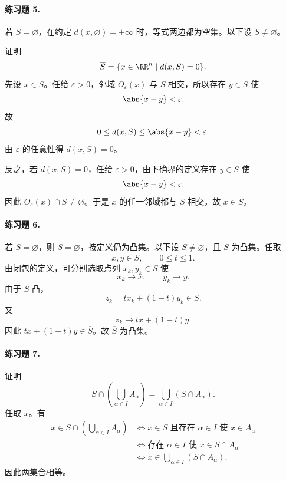 \paragraph{练习题 5.}
\begin{xsolution}
若 $S=\varnothing$，在约定 $d(x,\varnothing)=+\infty$ 时，等式两边都为空集。以下设 $S\neq\varnothing$。

证明
\[
  \overline S=\{x\in\RR^n\mid d(x,S)=0\}.
\]
先设 $x\in\overline S$。任给 $\varepsilon>0$，邻域 $O_\varepsilon(x)$ 与 $S$ 相交，所以存在 $y\in S$ 使
\[
  \abs{x-y}<\varepsilon.
\]
故
\[
  0\leq d(x,S)\leq\abs{x-y}<\varepsilon.
\]
由 $\varepsilon$ 的任意性得 $d(x,S)=0$。

反之，若 $d(x,S)=0$，任给 $\varepsilon>0$，由下确界的定义存在 $y\in S$ 使
\[
  \abs{x-y}<\varepsilon.
\]
因此 $O_\varepsilon(x)\cap S\neq\varnothing$。于是 $x$ 的任一邻域都与 $S$ 相交，故 $x\in\overline S$。
\end{xsolution}

\paragraph{练习题 6.}
\begin{xsolution}
若 $S=\varnothing$，则 $\overline S=\varnothing$，按定义仍为凸集。以下设 $S\neq\varnothing$，且 $S$ 为凸集。任取
\[
  x,y\in\overline S,\qquad 0\leq t\leq1.
\]
由闭包的定义，可分别选取点列 $x_k,y_k\in S$ 使
\[
  x_k\to x,\qquad y_k\to y.
\]
由于 $S$ 凸，
\[
  z_k=tx_k+(1-t)y_k\in S.
\]
又
\[
  z_k\to tx+(1-t)y.
\]
因此 $tx+(1-t)y\in\overline S$。故 $\overline S$ 为凸集。
\end{xsolution}

\paragraph{练习题 7.}
\begin{xsolution}
证明
\[
  S\cap\left(\bigcup_{\alpha\in I}A_\alpha\right)
  =\bigcup_{\alpha\in I}(S\cap A_\alpha).
\]
任取 $x$。有
\begin{align*}
  x\in S\cap\left(\bigcup_{\alpha\in I}A_\alpha\right)
  &\Longleftrightarrow x\in S\text{ 且存在 }\alpha\in I\text{ 使 }x\in A_\alpha\\
  &\Longleftrightarrow \text{存在 }\alpha\in I\text{ 使 }x\in S\cap A_\alpha\\
  &\Longleftrightarrow x\in\bigcup_{\alpha\in I}(S\cap A_\alpha).
\end{align*}
因此两集合相等。
\end{xsolution}

